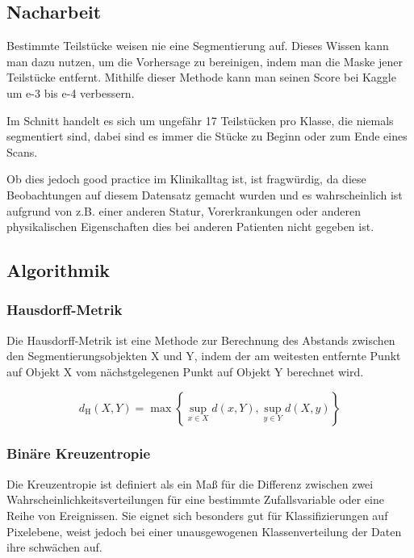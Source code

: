 \subsection{Nacharbeit}

Bestimmte Teilstücke weisen nie eine Segmentierung auf. Dieses Wissen kann man dazu nutzen, um die Vorhersage zu bereinigen, indem man die Maske jener Teilstücke entfernt. Mithilfe dieser Methode kann man seinen Score bei Kaggle um e-3 bis e-4 verbessern. 

Im Schnitt handelt es sich um ungefähr 17 Teilstücken pro Klasse, die niemals segmentiert sind, dabei sind es immer die Stücke zu Beginn oder zum Ende eines Scans.

Ob dies jedoch good practice im Klinikalltag ist, ist fragwürdig, da diese Beobachtungen auf diesem Datensatz gemacht wurden und es wahrscheinlich ist aufgrund von z.B. einer anderen Statur, Vorerkrankungen oder anderen physikalischen Eigenschaften dies bei anderen Patienten nicht gegeben ist. 

\pagebreak

\subsection{Algorithmik}

\subsubsection{Hausdorff-Metrik} \label{ssec:hdorff}
Die Hausdorff-Metrik ist eine Methode zur Berechnung des Abstands zwischen den Segmentierungsobjekten X und Y, indem der am weitesten entfernte Punkt auf Objekt X vom nächstgelegenen Punkt auf Objekt Y berechnet wird.

\begin{equation}
d_{\mathrm{H}}(X, Y)=\max \left\{\sup _{x \in X} d(x, Y), \sup _{y \in Y} d(X, y)\right\}
\end{equation}

\subsubsection{Binäre Kreuzentropie} \label{ssec:bce}

Die Kreuzentropie ist definiert als ein Maß für die Differenz zwischen zwei Wahrscheinlichkeitsverteilungen für eine bestimmte Zufallsvariable oder eine Reihe von Ereignissen. Sie eignet sich besonders gut für Klassifizierungen auf Pixelebene, weist jedoch bei einer unausgewogenen Klassenverteilung der Daten ihre schwächen auf. \citet{Jadon_2020} 


